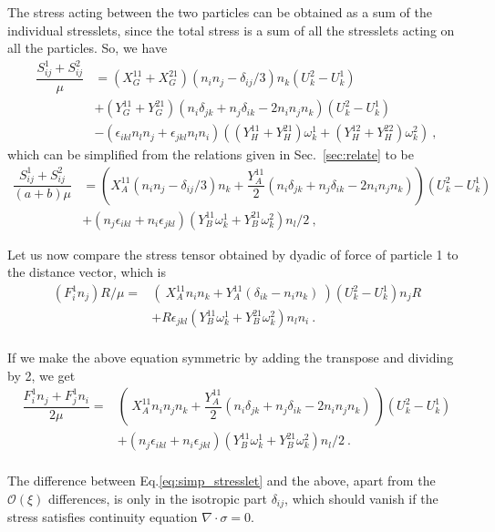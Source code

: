 \documentclass[reprint, amsmath,amssymb,aps,pre,onecolumn,notitlepage%
]{revtex4-1}
\begin{document}
The stress acting between the two particles can be obtained as a sum of the individual stresslets, since the total stress is a sum of all the stresslets acting on all the particles. So, we have
\begin{equation}
	\begin{split}
\dfrac{ S_{ij}^1+S_{ij}^2 }{ \mu } &= (X_G^{11}+ X_G^{21})(n_in_j-\delta_{ij}/3)n_k  (U_k^2-U_k^1)\\
&+(Y_G^{11}+Y_G^{21})(n_i\delta_{jk}+n_j\delta_{ik}-2n_in_jn_k) (U_k^2-U_k^1)\\
		&- \left(\epsilon_{ikl} n_l n_j+\epsilon_{jkl} n_l n_i \right)((Y_H^{11}+Y_H^{21})\omega_k^1+(Y_H^{12}+Y_H^{22})\omega_k^2)\ ,
	\end{split}
\end{equation}
which can be simplified from the relations given in Sec.~\ref{sec:relate} to be 
\begin{equation}
	\begin{split}
	\dfrac{ S^1_{ij}+S^2_{ij} }{(a+b)\mu }&=\left( X_A^{11} (n_in_j-\delta_{ij}/3)n_k+\dfrac{Y_A^{11}}{2}(n_i\delta_{jk}+n_j\delta_{ik}-2n_in_jn_k) \right)(U_k^2-U_k^1) \\ 
	&+ \left(n_j \epsilon_{ikl} +  n_i\epsilon_{jkl} \right)(Y_B^{11}\omega_k^1+Y_B^{21}\omega_k^2)n_l/2 \ ,
	       \end{split}
	       \label{eq:simp_stresslet}
\end{equation}

Let us now compare the stress tensor obtained by dyadic of force of particle 1 to the distance vector, which is
\begin{equation}
\begin{split}
	(F^1_i n_j)R/\mu=& (\ X_A^{11}n_in_k+Y_A^{11}(\delta_{ik}-n_in_k)\ )(U^2_k-U^1_k) n_j R\\
	&+ R \epsilon_{jkl} \left(Y_B^{11}\omega_k^1+Y_B^{21}\omega_k^2\right) n_l n_i \ .\\
\end{split}
\end{equation}

If we make the above equation symmetric by adding the transpose and dividing by 2, we get
\begin{equation}
\begin{split}
	\dfrac{F^1_i n_j+F^1_j n_i}{2 \mu}=& (\ X_A^{11} n_i n_j n_k + \dfrac{Y_A^{11}}{2}(n_i \delta_{jk}+n_j \delta_{ik}-2 n_in_jn_k)\ )(U^2_k-U^1_k) \\
	&+  ( n_j\epsilon_{ikl}+ n_i\epsilon_{jkl} ) \left(Y_B^{11}\omega_k^1+Y_B^{21}\omega_k^2\right) n_l/2  \ .\\
\end{split}
\end{equation}


The difference between Eq.\eqref{eq:simp_stresslet} and the above, apart from the $\mathcal{O}(\xi)$ differences, is only in the isotropic part $\delta_{ij}$, which should vanish if the stress satisfies continuity equation $\nabla\cdot\sigma=0$.



\end{document}
